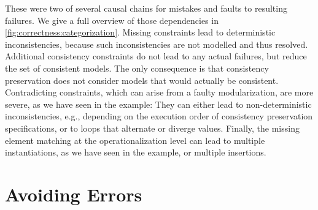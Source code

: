 These were two of several causal chains for mistakes and faults to resulting failures.
We give a full overview of those dependencies in \autoref{fig:correctness:categorization}.
Missing constraints lead to deterministic inconsistencies, because such inconsistencies are not modelled and thus resolved.
Additional consistency constraints do not lead to any actual failures, but reduce the set of consistent models. 
The only consequence is that consistency preservation does not consider models that would actually be consistent.
Contradicting constraints, which can arise from a faulty modularization, are more severe, as we have seen in the example:
They can either lead to non-deterministic inconsistencies, e.g., depending on the execution order of consistency preservation specifications, or to loops that alternate or diverge values.
Finally, the missing element matching at the operationalization level can lead to multiple instantiations, as we have seen in the example, or multiple insertions. %



\section{Avoiding Errors}

